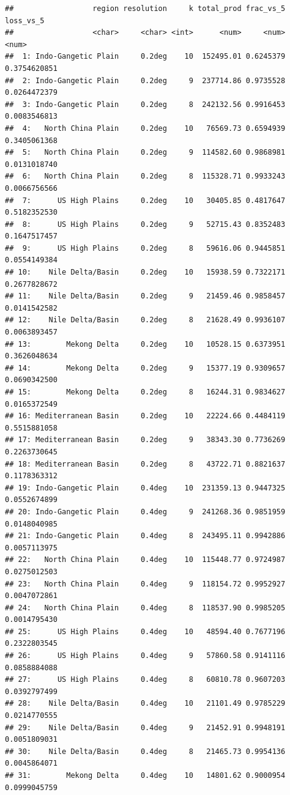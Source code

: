 \documentclass[
  11pt,
]{article}
\begin{document}
\begin{verbatim}
##                  region resolution     k total_prod frac_vs_5    loss_vs_5
##                  <char>     <char> <int>      <num>     <num>        <num>
##  1: Indo-Gangetic Plain     0.2deg    10  152495.01 0.6245379 0.3754620851
##  2: Indo-Gangetic Plain     0.2deg     9  237714.86 0.9735528 0.0264472379
##  3: Indo-Gangetic Plain     0.2deg     8  242132.56 0.9916453 0.0083546813
##  4:   North China Plain     0.2deg    10   76569.73 0.6594939 0.3405061368
##  5:   North China Plain     0.2deg     9  114582.60 0.9868981 0.0131018740
##  6:   North China Plain     0.2deg     8  115328.71 0.9933243 0.0066756566
##  7:      US High Plains     0.2deg    10   30405.85 0.4817647 0.5182352530
##  8:      US High Plains     0.2deg     9   52715.43 0.8352483 0.1647517457
##  9:      US High Plains     0.2deg     8   59616.06 0.9445851 0.0554149384
## 10:    Nile Delta/Basin     0.2deg    10   15938.59 0.7322171 0.2677828672
## 11:    Nile Delta/Basin     0.2deg     9   21459.46 0.9858457 0.0141542582
## 12:    Nile Delta/Basin     0.2deg     8   21628.49 0.9936107 0.0063893457
## 13:        Mekong Delta     0.2deg    10   10528.15 0.6373951 0.3626048634
## 14:        Mekong Delta     0.2deg     9   15377.19 0.9309657 0.0690342500
## 15:        Mekong Delta     0.2deg     8   16244.31 0.9834627 0.0165372549
## 16: Mediterranean Basin     0.2deg    10   22224.66 0.4484119 0.5515881058
## 17: Mediterranean Basin     0.2deg     9   38343.30 0.7736269 0.2263730645
## 18: Mediterranean Basin     0.2deg     8   43722.71 0.8821637 0.1178363312
## 19: Indo-Gangetic Plain     0.4deg    10  231359.13 0.9447325 0.0552674899
## 20: Indo-Gangetic Plain     0.4deg     9  241268.36 0.9851959 0.0148040985
## 21: Indo-Gangetic Plain     0.4deg     8  243495.11 0.9942886 0.0057113975
## 22:   North China Plain     0.4deg    10  115448.77 0.9724987 0.0275012503
## 23:   North China Plain     0.4deg     9  118154.72 0.9952927 0.0047072861
## 24:   North China Plain     0.4deg     8  118537.90 0.9985205 0.0014795430
## 25:      US High Plains     0.4deg    10   48594.40 0.7677196 0.2322803545
## 26:      US High Plains     0.4deg     9   57860.58 0.9141116 0.0858884088
## 27:      US High Plains     0.4deg     8   60810.78 0.9607203 0.0392797499
## 28:    Nile Delta/Basin     0.4deg    10   21101.49 0.9785229 0.0214770555
## 29:    Nile Delta/Basin     0.4deg     9   21452.91 0.9948191 0.0051809031
## 30:    Nile Delta/Basin     0.4deg     8   21465.73 0.9954136 0.0045864071
## 31:        Mekong Delta     0.4deg    10   14801.62 0.9000954 0.0999045759

\end{verbatim}
\end{document}

